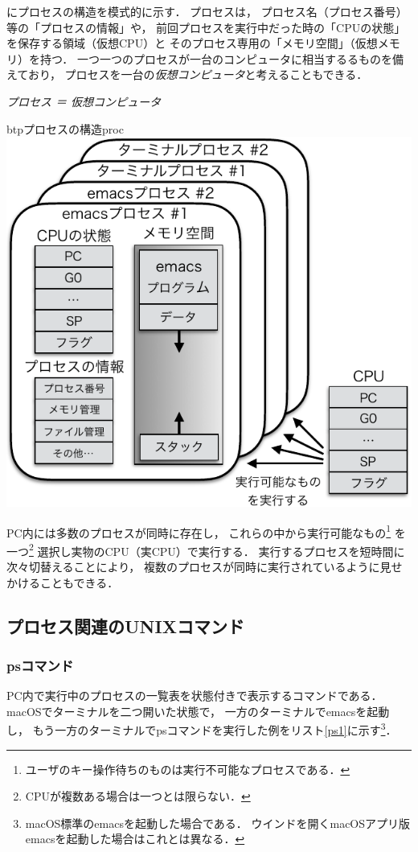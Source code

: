 にプロセスの構造を模式的に示す．
プロセスは，
プロセス名（プロセス番号）等の「プロセスの情報」や，
前回プロセスを実行中だった時の「CPUの状態」を保存する領域（仮想CPU）と
そのプロセス専用の「メモリ空間」（仮想メモリ）を持つ．
一つ一つのプロセスが一台のコンピュータに相当するるものを備えており，
プロセスを一台の\emph{仮想コンピュータ}と考えることもできる．

\begin{center}
\emph{\Large プロセス ＝ 仮想コンピュータ}
\end{center}


\begin{myfig}{btp}{プロセスの構造}{proc}
  \includegraphics[scale=0.9]{Fig/proc-crop.pdf}
\end{myfig}

PC内には多数のプロセスが同時に存在し，
これらの中から実行可能なもの\footnote{
ユーザのキー操作待ちのものは実行不可能なプロセスである．}
を一つ\footnote{CPUが複数ある場合は一つとは限らない．}
選択し実物のCPU（実CPU）で実行する．
実行するプロセスを短時間に次々切替えることにより，
複数のプロセスが同時に実行されているように見せかけることもできる．

\subsection{プロセス関連のUNIXコマンド}

\subsubsection{psコマンド}
PC内で実行中のプロセスの一覧表を状態付きで表示するコマンドである．
macOSでターミナルを二つ開いた状態で，
一方のターミナルでemacsを起動し，
もう一方のターミナルでpsコマンドを実行した例をリスト\ref{ps1}に示す\footnote{
macOS標準のemacsを起動した場合である．
ウインドを開くmacOSアプリ版emacsを起動した場合はこれとは異なる．
}．

